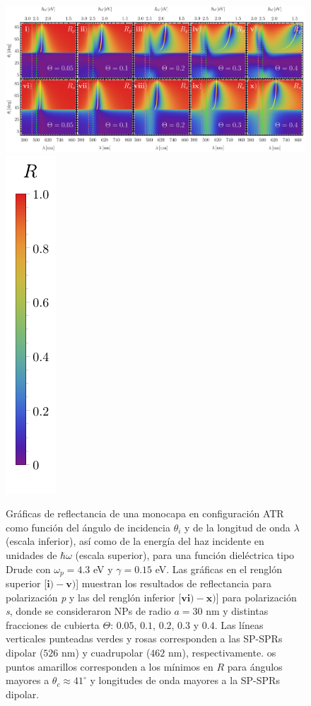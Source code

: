 	\begin{figure}[h!]\centering
\includegraphics[width = .9\linewidth, trim={00 00 00 00}, clip	]{2-Resultados/figs/1-Wp4ThetaVar/0-2D_Grid}%
\includegraphics[scale=.85, trim={00 -5 00 00}, clip]{2-Resultados/figs/0-RBar_v}
	\caption{Gráficas de reflectancia de una monocapa en configuración ATR como función del ángulo de incidencia $\theta_i$ y de la longitud de onda $\lambda$ (escala inferior), así como de la energía del haz incidente en unidades de $\hbar\omega$ (escala superior), para una función dieléctrica tipo Drude con $\omega_p=4. 3$ eV  y  $\gamma=0. 15$ eV.  Las gráficas   en el renglón superior [$\mathbf{i)-v)}$]  muestran los resultados de reflectancia para  polarización \emph{p} y las del renglón inferior  [$\mathbf{vi)-x)}$] para polarización  \emph{s}, donde se consideraron NPs de radio $a=30$ nm y distintas fracciones de cubierta $\Theta$: $0. 05$, $0. 1$, $0. 2$, $0. 3$ y $0. 4$. Las líneas verticales punteadas verdes y rosas corresponden a las SP-SPRs dipolar ($526$ nm) y cuadrupolar ($462$ nm), respectivamente.	os puntos amarillos corresponden a los mínimos en $R$ para ángulos mayores a $\theta_c\approx 41^\circ$ y longitudes de onda mayores a la SP-SPRs dipolar.}	\label{fig:R-ATR4}	
	\end{figure}	


